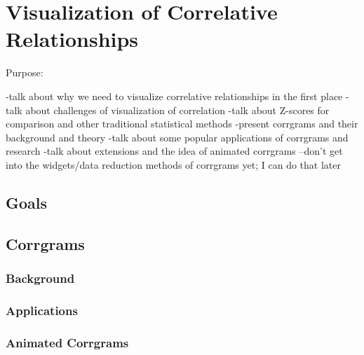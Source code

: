 \chapter{Visualization of Correlative Relationships}

Purpose:

-talk about why we need to visualize correlative relationships in the first place
-talk about challenges of visualization of correlation
-talk about Z-scores for comparison and other traditional statistical methods
-present corrgrams and their background and theory
-talk about some popular applications of corrgrams and research
-talk about extensions and the idea of animated corrgrams
--don't get into the widgets/data reduction methods of corrgrams yet; I can do that later


\section{Goals}





\section{Corrgrams}

\subsection{Background}

\subsection{Applications}

\subsection{Animated Corrgrams}

